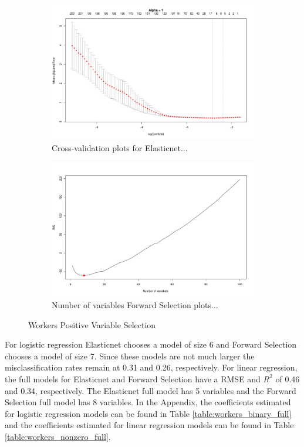 \documentclass{article}
\begin{document}
\begin{figure}[!tbp]
\begin{subfigure}[b]{0.5\textwidth}
\includegraphics[width=\textwidth]{elastic_cv_workers_nonzero.pdf}
\caption{Cross-validation plots for Elasticnet...}
\end{subfigure}
\hfill
\begin{subfigure}[b]{0.5\textwidth}
\includegraphics[width=\textwidth]{forward_nvars_workers_nonzero.pdf}
\caption{Number of variables Forward Selection plots...}
\end{subfigure}
\caption{Workers Positive Variable Selection}
\label{figure:workers_nonzero_opt}
\end{figure}

For logistic regression Elasticnet chooses a model of size 6 and Forward Selection chooses a model of size 7. Since these 
models are not much larger the misclassification rates remain at 0.31 and 0.26, respectively. For linear regression, the full 
models for Elasticnet and Forward Selection have a RMSE and $R^2$ of 0.46 and 0.34, respectively. The Elasticnet full model 
has 5 variables and the Forward Selection full model has 8 variables.  In the Appendix, the coefficients estimated for logistic 
regression models can be found in Table \ref{table:workers_binary_full} and the coefficients estimated for linear regression 
models can be found in Table \ref{table:workers_nonzero_full}. 
\end{document}
